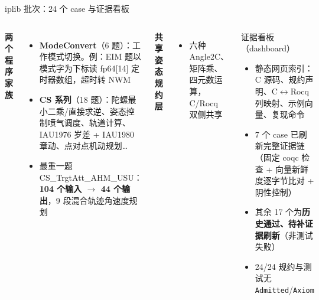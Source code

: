 \documentclass[UTF8,aspectratio=169]{ctexbeamer}
\begin{document}
\begin{frame}{iplib 批次：24 个 case 与证据看板}
  \begin{columns}[T]
    \textbf{两个程序家族}
    \begin{itemize}\small
      \item \textbf{ModeConvert}（6 题）：工作模式切换。例：EIM 题以模式字为下标读 fp64[14] 定时器数组，超时转 NWM
      \item \textbf{CS 系列}（18 题）：陀螺最小二乘/直接求逆、姿态控制喷气调度、轨道计算、IAU1976 岁差 + IAU1980 章动、点对点机动规划\ldots
      \item 最重一题 CS\_TrgtAtt\_AHM\_USU：\textbf{104 个输入 $\to$ 44 个输出}，9 段混合轨迹角速度规划
    \end{itemize}
    \textbf{共享姿态规约层}
    \begin{itemize}\small
      \item 六种 Angle2C、矩阵乘、四元数运算，C/Rocq 双侧共享
    \end{itemize}
    \begin{block}{证据看板（dashboard）}
      \small
      \begin{itemize}
        \item 静态网页索引：C 源码、规约声明、C$\leftrightarrow$Rocq 列映射、示例向量、复现命令
        \item 7 个 case 已刷新完整证据链（固定 coqc 检查 + 向量新鲜度逐字节比对 + 阴性控制）
        \item 其余 17 个为\textbf{历史通过、待补证据刷新}（非测试失败）
        \item 24/24 规约与测试无 \texttt{Admitted}/\texttt{Axiom}
      \end{itemize}
    \end{block}
  \end{columns}
\end{frame}
\end{document}
